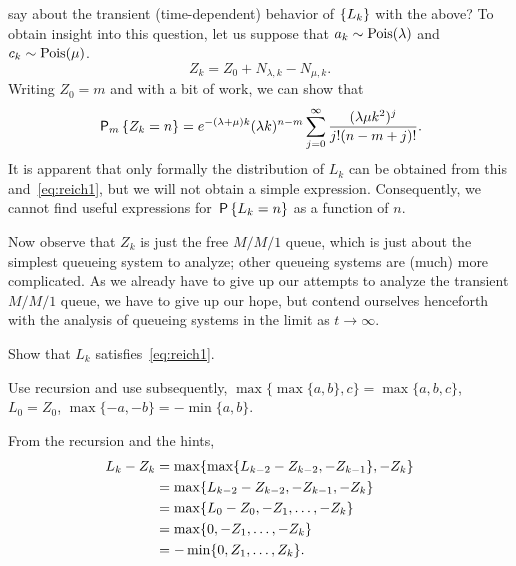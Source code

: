  say about the transient (time-dependent) behavior of $\{\L_k\}$ with the above?
To obtain insight into this question, let us suppose that $a_k\sim \Pois{\lambda}$ and $c_k \sim \Pois{\mu}$.
\begin{equation*}
 Z_k = Z_0+N_{\lambda, k} - N_{\mu, k}.
\end{equation*}
Writing $Z_0=m$ and with a bit of work, we can show that
\begin{equation}\label{eq:rw2}
 \PP{m}{Z_k=n}
= e^{-(\lambda+\mu)k} (\lambda k)^{n-m} \sum_{j=0}^\infty
\frac{(\lambda\mu k^2)^j} {j!(n-m+j)!}.
\end{equation}
It is apparent that only formally the distribution of $L_{k}$ can be obtained from this and~\cref{eq:reich1}, but  we will not obtain a simple  expression. Consequently, we cannot find useful expressions for $\P{L_k=n}$ as a function of $n$.

Now observe that $Z_k$ is just the free $M/M/1$ queue, which is just about the simplest queueing system to analyze; other queueing systems are (much) more complicated. As we already have to give up our attempts to analyze the transient $M/M/1$ queue, we have to give up our hope, but contend ourselves henceforth with the analysis of queueing systems in the limit as $t\to\infty$.


\begin{exercise}\label{ex:l-133}
Show that $L_k$ satisfies~\cref{eq:reich1}.
\begin{hint}
  Use recursion and use subsequently,
$\max\{\max\{a,b\}, c\} = \max\{a,b,c\}$, $L_0 = Z_0$, $\max\{-a, -b \} = -\min\{a,b\}$.
\end{hint}
\begin{solution}
From the recursion and the hints,
\begin{equation*}
 \begin{split}
 L_k - Z_{k}
&= \max\{\max\{\L_{k-2} - Z_{k-2}, -Z_{k-1}\}, -Z_k\} \\
&= \max\{\L_{k-2} - Z_{k-2}, -Z_{k-1}, -Z_k\} \\
&= \max\{\L_{0} - Z_{0}, -Z_1, \ldots, -Z_k\} \\
&= \max\{0, -Z_1, \ldots, -Z_k\} \\
&= - \min\{0, Z_1, \ldots, Z_k\}.
 \end{split}
 \end{equation*}
\end{solution}
\end{exercise}


